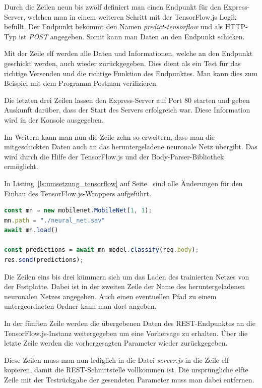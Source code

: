 Durch die Zeilen neun bis zwölf definiert man einen Endpunkt für den Express-Server, welchen man in einem weiteren
Schritt mit der TensorFlow.js Logik befüllt. Der Endpunkt bekommt den Namen \textit{predict-tensorflow} und als HTTP-Typ
ist \textit{POST} angegeben. Somit kann man Daten an den Endpunkt schicken.

Mit der Zeile elf werden alle Daten und Informationen, welche an den Endpunkt geschickt werden, auch wieder
zurückgegeben. Dies dient als ein Test für das richtige Versenden und die richtige Funktion des Endpunktes. Man kann
dies zum Beispiel mit dem Programm Postman verifizieren.

Die letzten drei Zeilen lassen den Express-Server auf Port 80 starten und geben Auskunft darüber, dass der Start des
Servers erfolgreich war. Diese Information wird in der Konsole ausgegeben.

Im Weitern kann man nun die Zeile zehn so erweitern, dass man die mitgeschickten Daten auch an das heruntergeladene
neuronale Netz übergibt. Das wird durch die Hilfe der TensorFlow.js und der Body-Parser-Bibliothek ermöglicht.

In Listing~\ref{ls:umsetzung_tensorflow} auf Seite~\pageref{ls:umsetzung_tensorflow} sind alle Änderungen für den Einbau
des TensorFlow.js-Wrappers aufgeführt.

\begin{lstlisting}[language=JavaScript, caption=Der TensorFlow.js Programmteil, label=ls:umsetzung_tensorflow]
const mn = new mobilenet.MobileNet(1, 1);
mn.path = "./neural_net.sav"
await mn.load()

const predictions = await mn_model.classify(req.body);
res.send(predictions);
\end{lstlisting}

Die Zeilen eins bis drei kümmern sich um das Laden des trainierten Netzes von der Festplatte. Dabei ist in der zweiten
Zeile der Name des heruntergeladenen neuronalen Netzes angegeben. Auch einen eventuellen Pfad zu einem untergeordneten
Ordner kann man dort angeben.

In der fünften Zeile werden die übergebenen Daten des REST-Endpunktes an die TensorFlow.js-Instanz weitergegeben um eine
Vorhersage zu erhalten. Über die letzte Zeile werden die vorhergesagten Parameter wieder zurückgegeben.

Diese Zeilen muss man nun lediglich in die Datei \textit{server.js} in die Zeile elf kopieren, damit die
REST-Schnittstelle vollkommen ist. Die ursprüngliche elfte Zeile mit der Testrückgabe der gesendeten Parameter muss man
dabei entfernen.

